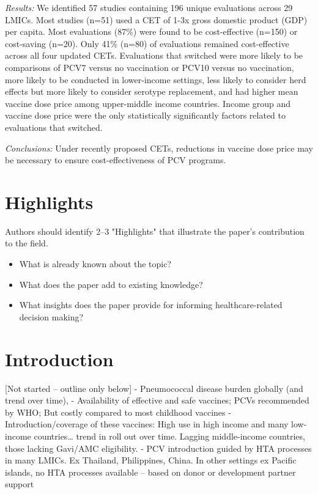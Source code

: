 \documentclass[12pt]{article}
\begin{document}
\textit{Results:} We identified 57 studies containing 196 unique evaluations across 29 LMICs. Most studies (n=51) used a CET of 1-3x gross domestic product (GDP) per capita. Most evaluations (87\%) were found to be cost-effective (n=150) or cost-saving (n=20). Only 41\% (n=80) of evaluations remained cost-effective across all four updated CETs. Evaluations that switched were more likely to be comparisons of PCV7 versus no vaccination or PCV10 versus no vaccination, more likely to be conducted in lower-income settings, less likely to consider herd effects but more likely to consider serotype replacement, and had higher mean vaccine dose price among upper-middle income countries. Income group and vaccine dose price were the only statistically significantly factors related to evaluations that switched. 

\textit{Conclusions:} Under recently proposed CETs, reductions in vaccine dose price may be necessary to ensure cost-effectiveness of PCV programs.


\clearpage
\section*{Highlights}
Authors should identify 2–3 "Highlights" that illustrate the paper's contribution to the field. 
\begin{itemize}
    \item What is already known about the topic?
    \item What does the paper add to existing knowledge?
    \item What insights does the paper provide for informing healthcare-related decision making?
\end{itemize}


\clearpage
\section*{Introduction}

[Not started – outline only below]
-	Pneumococcal disease burden globally (and trend over time), 
-	Availability of effective and safe vaccines; PCVs recommended by WHO; But costly compared to most childhood vaccines 
-	Introduction/coverage of these vaccines: High use in high income and many low-income countries… trend in roll out over time. Lagging middle-income countries, those lacking Gavi/AMC eligibility.
-	PCV  introduction guided by HTA processes in many LMICs. Ex Thailand, Philippines, China. In other settings ex Pacific islands, no HTA processes available – based on donor or development partner support 
\end{document}
